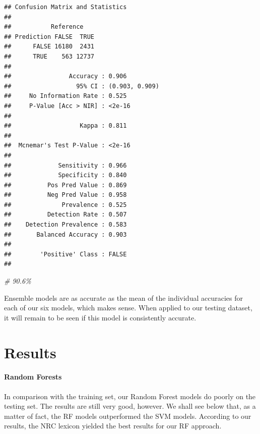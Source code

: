 \documentclass[
]{article}
\newenvironment{Shaded}{\begin{snugshade}}{\end{snugshade}}
\newcommand{\CommentTok}[1]{\textcolor[rgb]{0.56,0.35,0.01}{\textit{#1}}}
\begin{document}
\begin{verbatim}
## Confusion Matrix and Statistics
## 
##           Reference
## Prediction FALSE  TRUE
##      FALSE 16180  2431
##      TRUE    563 12737
##                                         
##                Accuracy : 0.906         
##                  95% CI : (0.903, 0.909)
##     No Information Rate : 0.525         
##     P-Value [Acc > NIR] : <2e-16        
##                                         
##                   Kappa : 0.811         
##                                         
##  Mcnemar's Test P-Value : <2e-16        
##                                         
##             Sensitivity : 0.966         
##             Specificity : 0.840         
##          Pos Pred Value : 0.869         
##          Neg Pred Value : 0.958         
##              Prevalence : 0.525         
##          Detection Rate : 0.507         
##    Detection Prevalence : 0.583         
##       Balanced Accuracy : 0.903         
##                                         
##        'Positive' Class : FALSE         
## 
\end{verbatim}

\begin{Shaded}
\begin{Highlighting}[]
\CommentTok{\# 90.6\%}
\end{Highlighting}
\end{Shaded}

Ensemble models are as accurate as the mean of the individual accuracies
for each of our six models, which makes sense. When applied to our
testing dataset, it will remain to be seen if this model is consistently
accurate.

\pagebreak

\hypertarget{results}{%
\section{Results}\label{results}}

\hypertarget{random-forests-1}{%
\paragraph{Random Forests}\label{random-forests-1}}

In comparison with the training set, our Random Forest models do poorly
on the testing set. The results are still very good, however. We shall
see below that, as a matter of fact, the RF models outperformed the SVM
models. According to our results, the NRC lexicon yielded the best
results for our RF approach.
\end{document}
